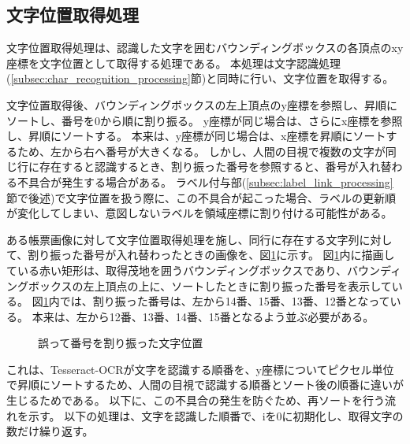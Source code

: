 \subsection{文字位置取得処理}\label{subsec:char_position_obtainment_processing}
文字位置取得処理は、認識した文字を囲むバウンディングボックスの各頂点のxy座標を文字位置として取得する処理である。
本処理は文字認識処理(\ref{subsec:char_recognition_processing}節)と同時に行い、文字位置を取得する。

文字位置取得後、バウンディングボックスの左上頂点のy座標を参照し、昇順にソートし、番号を0から順に割り振る。
y座標が同じ場合は、さらにx座標を参照し、昇順にソートする。
本来は、y座標が同じ場合は、x座標を昇順にソートするため、左から右へ番号が大きくなる。
しかし、人間の目視で複数の文字が同じ行に存在すると認識するとき、割り振った番号を参照すると、番号が入れ替わる不具合が発生する場合がある。
ラベル付与部(\ref{subsec:label_link_processing}節で後述)で文字位置を扱う際に、この不具合が起こった場合、ラベルの更新順が変化してしまい、意図しないラベルを領域座標に割り付ける可能性がある。

ある帳票画像に対して文字位置取得処理を施し、同行に存在する文字列に対して、割り振った番号が入れ替わったときの画像を、図\ref{fig:before_sorted_string}に示す。
図\ref{fig:before_sorted_string}内に描画している赤い矩形は、取得茂地を囲うバウンディングボックスであり、バウンディングボックスの左上頂点の上に、ソートしたときに割り振った番号を表示している。
図\ref{fig:before_sorted_string}内では、割り振った番号は、左から14番、15番、13番、12番となっている。
本来は、左から12番、13番、14番、15番となるよう並ぶ必要がある。

\begin{figure}[t]
    \begin{center}
        \caption{誤って番号を割り振った文字位置}
        \label{fig:before_sorted_string}
    \end{center}
\end{figure}

これは、Tesseract-OCRが文字を認識する順番を、y座標についてピクセル単位で昇順にソートするため、人間の目視で認識する順番とソート後の順番に違いが生じるためである。
以下に、この不具合の発生を防ぐため、再ソートを行う流れを示す。
以下の処理は、文字を認識した順番で、iを0に初期化し、取得文字の数だけ繰り返す。

